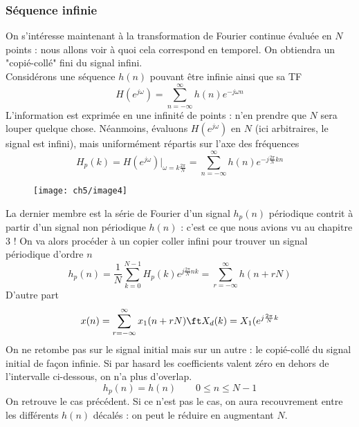 		\subsubsection{Séquence infinie}
		On s'intéresse maintenant à la transformation de Fourier continue évaluée en $N$ points : 
		nous allons voir à quoi cela correspond en temporel. On obtiendra un "copié-collé" fini du 
		signal infini.\\
		Considérons une séquence $h(n)$ pouvant être infinie ainsi que sa TF
		\begin{equation}
		H(e^{j\omega}) = \sum_{n=-\infty}^\infty h(n)e^{-j\omega n}
		\end{equation}
		L'information est exprimée en une infinité de points : n'en prendre que $N$ sera louper 
		quelque chose. Néanmoins, évaluons $H(e^{j\omega})$ en $N$ (ici arbitraires, le signal est 
		infini), mais uniformément 	répartis sur l'axe des fréquences
		\begin{equation}
		H_p(k) = H(e^{j\omega})|_{\omega=k\frac{2\pi}{N}} = \sum_{n=-\infty}^\infty h(n)e^{-j\frac{2\pi}{
		N}kn}
		\end{equation}
\vspace{-5mm}
			\begin{wrapfigure}[22]{l}{7cm}
		\texttt{[image: ch5/image4]}
	\end{wrapfigure}	
		La dernier membre est la série de Fourier d'un signal $h_p(n)$ périodique contrit à partir d'un 
		signal non périodique $h(n)$ : c'est ce que nous avions vu au chapitre 3 ! On va alors procéder 
		à un copier coller infini pour trouver un signal périodique d'ordre $n$
		\begin{equation}
		h_p(n) = \frac{1}{N}\sum_{k=0}^{N-1} H_p(k)e^{j\frac{2\pi}{N}nk} = \sum_{r=-\infty}^\infty h(n+rN)
		\end{equation}
		D'autre part
		\begin{equation}
		x(n) = \sum_{r=-\infty}^\infty x_1(n+rN) \ft X_d(k) = X_1(e^{j\frac{2\pi}{N}k}
		\end{equation}
		On ne retombe pas sur le signal initial mais sur un autre : le copié-collé du signal initial 
		de façon infinie. Si par hasard les coefficients valent zéro en dehors de l'intervalle 
		ci-dessous, on n'a plus d'overlap.
		\begin{equation}
		h_p (n) = h(n)\qquad 0\leq n \leq N-1
		\end{equation}
		On retrouve le cas précédent. Si ce n'est pas le cas, on aura recouvrement entre les différents 
		$h(n)$ décalés : on peut le réduire en augmentant $N$.

